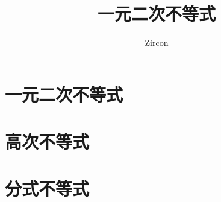 \documentclass[oneside]{book}
\def\notetitle{一元二次不等式}
\def\noteauthor{Zircon}
\def\notedate{}
\begin{document}
\title{\heiti \LARGE \notetitle \vspace*{8\baselineskip}}
\author{\noteauthor}
\date{\notedate}

\maketitle
\newpage

\setcounter{tocdepth}{1}
\tableofcontents
\newpage

\part{一元二次不等式}


\part{高次不等式}


\part{分式不等式}

\end{document}
